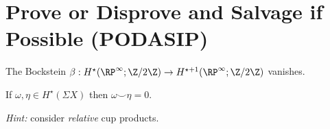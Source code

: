 \documentclass{homework}
\begin{document}
\section{Prove or Disprove and Salvage if Possible (PODASIP)}

\begin{problem}
  The Bockstein $\beta : H^\star(\RP^\infty ; \Z/2\Z) \to H^{\star + 1}(\RP^\infty ; \Z/2\Z)$ vanishes.
\end{problem}

\begin{problem} %
If $\omega, \eta \in H^\star(\Sigma X)$ then $\omega \smile \eta = 0$.

\textit{Hint:} consider \textit{relative} cup products.
\end{problem}
\end{document}
